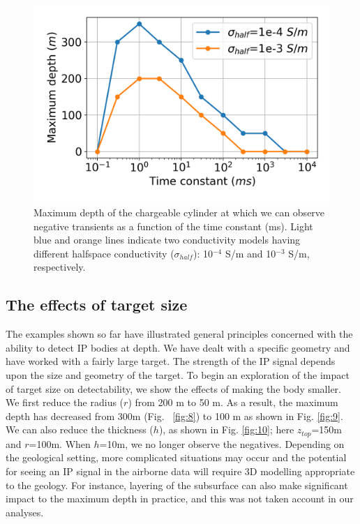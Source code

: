 \documentclass[manuscript]{geophysics}
\begin{document}
\begin{figure}[htb]
  \centering
  \includegraphics[width=1.0\textwidth]{figures/tau-vs-depth}
  \caption{Maximum depth of the chargeable cylinder at which we can observe negative transients as a function of the time constant (ms). Light blue and orange lines indicate two conductivity models having different halfspace conductivity ($\sigma_{half}$): 10$^{-4}$ S/m and 10$^{-3}$ S/m, respectively.}
  \label{fig:8-2}
\end{figure}
\clearpage

\subsection{The effects of target size}
The examples shown so far have illustrated general principles concerned with the ability to detect IP bodies at depth. We have dealt with a specific geometry and have worked with a fairly large target. The strength of the IP signal depends upon the size and geometry of the target. To begin an exploration of the impact of target size on detectability, we show the effects of making the body smaller. We first reduce the radius ($r$) from 200 m to 50 m. As a result, the maximum depth has decreased from 300m (Fig. ~\ref{fig:8}) to 100 m as shown in Fig. \ref{fig:9}. We can also reduce the thickness ($h$), as shown in Fig. \ref{fig:10}; here $z_{top}$=150m and $r$=100m. When $h$=10m, we no longer observe the negatives. Depending on the geological setting, more complicated situations may occur and the potential for seeing an IP signal in the airborne data will require 3D modelling appropriate to the geology. For instance, layering of the subsurface can also make significant impact to the maximum depth in practice, and this was not taken account in our analyses.
\end{document}
